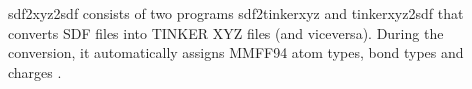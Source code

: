 sdf2xyz2sdf consists of two programs sdf2tinkerxyz and tinkerxyz2sdf that converts SDF files into TINKER XYZ files (and viceversa). During the conversion, it automatically assigns MMFF94 atom types, bond types and charges \cite{Tosco_2011}.